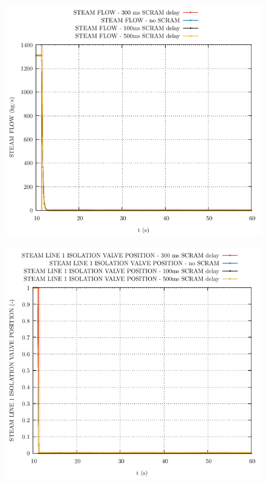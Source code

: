 \documentclass{article}
\begin{document}
\begin{multicols}{2}
\begin{figure}[H]
\end{figure}
\begin{figure}[H]
\centering
\includegraphics[width=\columnwidth]{./graphs/STEAM FLOW_comp.pdf}
\end{figure}
\begin{figure}[H]
\centering
\includegraphics[width=\columnwidth]{./graphs/STEAM LINE 1 ISOLATION VALVE POSITION_comp.pdf}

\end{figure}
\end{multicols}
\end{document}
